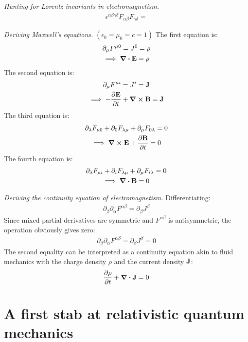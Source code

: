 \documentclass{report}
\begin{document}
\begin{subquests}
	\item \emph{Hunting for Lorentz invariants in electromagnetism.}
	\begin{gather*}
		\epsilon^{\alpha\beta\gamma\delta}F_{\alpha\beta}F_{\gamma\delta} = 
	\end{gather*}
	\item \emph{Deriving Maxwell's equations.} $(\epsilon_0 = \mu_0 = c = 1)$ The first equation is:
	\begin{gather*}
		\partial_{\mu}F^{\mu 0} = J^0 = \rho \\
		\implies \div \vb{E} = \rho
	\end{gather*}
	The second equation is:
	\begin{gather*}
		\partial_{\mu}F^{\mu i} = J^i = \vb J \\
		\implies -\pdv{\vb E}{t} + \curl \vb B = \vb J
	\end{gather*}
	The third equation is:
	\begin{gather*}
		\partial_{\lambda}F_{\mu 0} + \partial_0 F_{\lambda\mu} + \partial_{\mu}F_{0\lambda} = 0 \\
		\implies \curl \vb{E} + \pdv{\vb B}{t} = 0
	\end{gather*}
	The fourth equation is:
	\begin{gather*}
		\partial_{\lambda}F_{\mu i} + \partial_i F_{\lambda\mu} + \partial_{\mu}F_{i\lambda} = 0 \\
		\implies \div \vb B = 0
	\end{gather*}
	\item \emph{Deriving the continuity equation of electromagnetism.} Differentiating:
	\begin{gather*}
		\partial_{\beta}\partial_{\alpha}F^{\alpha\beta} = \partial_{\beta}J^{\beta} 
	\end{gather*}
	Since mixed partial derivatives are symmetric and $F^{\alpha\beta}$ is antisymmetric, the operation obviously gives zero:
	\begin{gather*}
		\partial_{\beta}\partial_{\alpha}F^{\alpha\beta} = \partial_{\beta}J^{\beta} = 0
	\end{gather*}
	The second equality can be interpreted as a continuity equation akin to fluid mechanics with the charge density $\rho$ and the current density $\vb J$:
	\begin{gather*}
		\pdv{\rho}{t} + \div \vb{J} = 0
	\end{gather*}
\end{subquests}


\chapter{A first stab at relativistic quantum mechanics}
\end{document}
